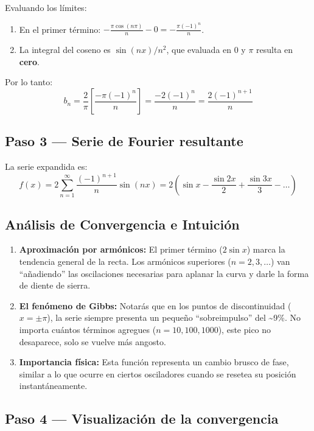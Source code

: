 \documentclass[
  letterpaper,
  DIV=11,
  numbers=noendperiod]{scrreprt}
\providecommand{\tightlist}{%
  \setlength{\itemsep}{0pt}\setlength{\parskip}{0pt}}
\begin{document}
Evaluando los límites:

\begin{enumerate}
\def\labelenumi{\arabic{enumi}.}
\tightlist
\item
  En el primer término:
  \(-\frac{\pi \cos(n\pi)}{n} - 0 = -\frac{\pi (-1)^n}{n}\).
\item
  La integral del coseno es \(\sin(nx)/n^2\), que evaluada en \(0\) y
  \(\pi\) resulta en \textbf{cero}.
\end{enumerate}

Por lo tanto:
\[b_n = \frac{2}{\pi} \left[ \frac{-\pi(-1)^n}{n} \right] = \frac{-2(-1)^n}{n} = \frac{2(-1)^{n+1}}{n}\]

\subsection{Paso 3 --- Serie de Fourier
resultante}\label{paso-3-serie-de-fourier-resultante}

La serie expandida es: \[
\boxed{f(x) = 2\sum_{n=1}^{\infty} \frac{(-1)^{n+1}}{n}\sin(nx) = 2\left(\sin x - \frac{\sin 2x}{2} + \frac{\sin 3x}{3} - \dots\right)}
\]

\subsection{Análisis de Convergencia e
Intuición}\label{anuxe1lisis-de-convergencia-e-intuiciuxf3n}

\begin{enumerate}
\def\labelenumi{\arabic{enumi}.}
\tightlist
\item
  \textbf{Aproximación por armónicos:} El primer término (\(2\sin x\))
  marca la tendencia general de la recta. Los armónicos superiores
  (\(n=2, 3, \dots\)) van ``añadiendo'' las oscilaciones necesarias para
  aplanar la curva y darle la forma de diente de sierra.
\item
  \textbf{El fenómeno de Gibbs:} Notarás que en los puntos de
  discontinuidad (\(x = \pm\pi\)), la serie siempre presenta un pequeño
  ``sobreimpulso'' del \textasciitilde9\%. No importa cuántos términos
  agregues (\(n=10, 100, 1000\)), este pico no desaparece, solo se
  vuelve más angosto.
\item
  \textbf{Importancia física:} Esta función representa un cambio brusco
  de fase, similar a lo que ocurre en ciertos osciladores cuando se
  resetea su posición instantáneamente.
\end{enumerate}

\subsection{Paso 4 --- Visualización de la
convergencia}\label{paso-4-visualizaciuxf3n-de-la-convergencia}
\end{document}
